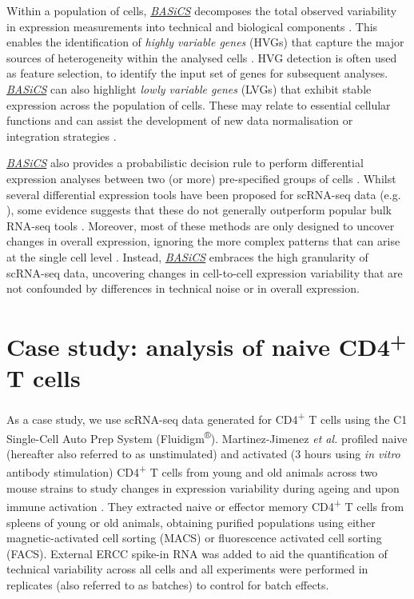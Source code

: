 \documentclass[9pt,a4paper,]{extarticle}
\begin{document}
Within a population of cells, \emph{\href{https://bioconductor.org/packages/3.11/BASiCS}{BASiCS}} decomposes the total
observed variability in expression measurements into technical and biological
components \citep{Vallejos2015}.
This enables the identification of \emph{highly variable genes} (HVGs) that capture
the major sources of heterogeneity within the analysed cells \citep{Brennecke2013}.
HVG detection is often used as feature selection, to identify the input
set of genes for subsequent analyses.
\emph{\href{https://bioconductor.org/packages/3.11/BASiCS}{BASiCS}} can also highlight \emph{lowly variable genes} (LVGs) that
exhibit stable expression across the population of cells.
These may relate to essential cellular functions and can assist the development
of new data normalisation or integration strategies \citep{Lin2019}.

\emph{\href{https://bioconductor.org/packages/3.11/BASiCS}{BASiCS}} also provides a probabilistic decision rule to
perform differential expression analyses between two (or more) pre-specified
groups of cells \citep{Vallejos2016, Eling2018}.
Whilst several differential expression tools have been proposed for scRNA-seq
data (e.g. \citep{Kharchenko2014, Finak2015}), some evidence suggests that
these do not generally outperform popular bulk RNA-seq tools \citep{Soneson2018}.
Moreover, most of these methods are only designed to uncover changes in overall
expression, ignoring the more complex patterns that can arise at the single cell
level \citep{Lahnemann2020}.
Instead, \emph{\href{https://bioconductor.org/packages/3.11/BASiCS}{BASiCS}} embraces the high granularity of scRNA-seq data,
uncovering changes in cell-to-cell expression variability that are not
confounded by differences in technical noise or in overall expression.

\hypertarget{Tcells}{%
\section{\texorpdfstring{Case study: analysis of naive CD4\textsuperscript{+} T cells}{Case study: analysis of naive CD4+ T cells}}\label{Tcells}}

As a case study, we use scRNA-seq data generated for CD4\textsuperscript{+} T cells
using the C1 Single-Cell Auto Prep System (Fluidigm\textsuperscript{®}).
Martinez-Jimenez \emph{et al.} profiled naive (hereafter also referred to as
unstimulated) and activated (3 hours using \emph{in vitro} antibody stimulation)
CD4\textsuperscript{+} T cells from young and old animals across two mouse strains to study
changes in expression variability during ageing and upon immune activation
\citep{Martinez-jimenez2017}.
They extracted naive or effector memory CD4\textsuperscript{+} T cells from spleens of young or
old animals, obtaining purified populations using either magnetic-activated cell
sorting (MACS) or fluorescence activated cell sorting (FACS).
External ERCC spike-in RNA \citep{Rna2005} was added to aid the quantification of
technical variability across all cells and all experiments were performed in
replicates (also referred to as batches) to control for batch effects.
\end{document}

